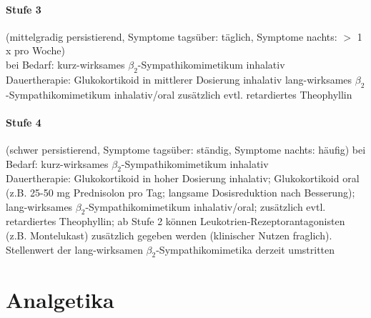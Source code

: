\documentclass[10pt,a4paper]{report}
\begin{document}
\subsubsection{Stufe 3} %
\label{par:stufe_3}
(mittelgradig persistierend, Symptome tagsüber: täglich, 
Symptome nachts: $>$ 1 x pro Woche)\\
bei Bedarf:	kurz-wirksames $\beta_2$-Sympathikomimetikum inhalativ \\
Dauertherapie: Glukokortikoid in mittlerer Dosierung inhalativ lang-wirksames $\beta_2$-Sympathikomimetikum inhalativ/oral zusätzlich evtl. retardiertes Theophyllin 
\subsubsection{Stufe 4} %
\label{par:stufe_4}
(schwer persistierend, Symptome tagsüber: ständig, Symptome nachts: häufig)
bei Bedarf: kurz-wirksames $\beta_2$-Sympathikomimetikum inhalativ \\
Dauertherapie: Glukokortikoid in hoher Dosierung inhalativ; Glukokortikoid oral (z.B. 25-50 mg Prednisolon pro Tag; langsame Dosisreduktion nach Besserung); lang-wirksames $\beta_2$-Sympathikomimetikum inhalativ/oral; zusätzlich evtl. retardiertes Theophyllin;  ab Stufe 2 können Leukotrien-Rezeptorantagonisten (z.B. Montelukast) zusätzlich gegeben werden (klinischer Nutzen fraglich). Stellenwert der lang-wirksamen $\beta_2$-Sympathikomimetika derzeit umstritten
\chapter{Analgetika} %
\label{cha:analgetika}
\end{document}
